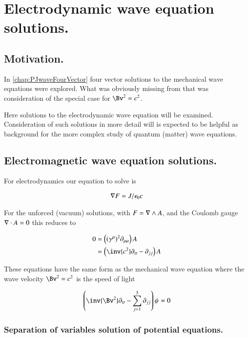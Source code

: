 \chapter{Electrodynamic wave equation solutions.}\label{chap:PJemWave}

\section{Motivation. }

In \ref{chap:PJwaveFourVector} four vector solutions to the mechanical wave
equations were explored.  What was obviously missing from that 
was consideration of the special case for $\Bv^2 = c^2$.

Here solutions to the electrodynamic wave equation will be examined.
Consideration of such solutions in more detail will is expected
to be helpful 
as background for the more complex study of quantum (matter) wave equations.

\section{Electromagnetic wave equation solutions. }

For electrodynamics our equation to solve is

\begin{align}
\nabla F = J/\epsilon_0 c
\end{align}

For the unforced (vacuum) solutions, with 
$F = \nabla \wedge A$, and the Coulomb gauge $\nabla \cdot A = 0$ this 
reduces to

\begin{align*}
0 
&= \left((\gamma^\mu)^2 \partial_{\mu\mu}\right) A  \\
&= \left( \inv{c^2}\partial_{tt} -\partial_{jj} \right) A
\end{align*}

These equations have the same form as the mechanical wave equation
where the wave velocity $\Bv^2 = c^2$ is the speed of light

\begin{align}\label{eqn:em_wave:waveEquation}
\left( \inv{\Bv^2} \partial_{tt} - \sum_{j=1}^3 \partial_{jj}\right) \psi = 0
\end{align}

\subsection{Separation of variables solution of potential equations. }

